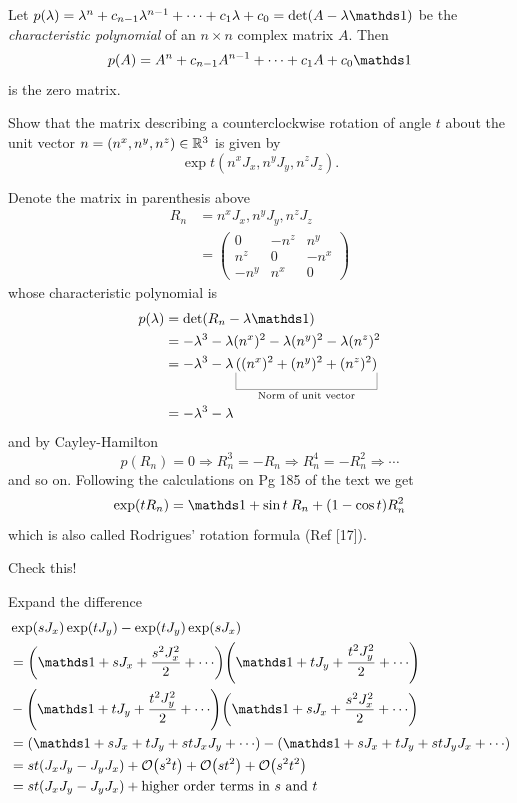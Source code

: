 \documentclass[10pt]{article}
\begin{document}
\begin{definition}
	 Let $p(\lambda) = \lambda^n + c_{n-1} \lambda^{n-1} + \cdots + c_1 \lambda + c_0 = \det(A - \lambda\id)$ be the \emph{characteristic polynomial} of an $n\times n$ complex matrix $A$. Then
	$$p(A) = A^n + c_{n-1} A^{n-1} + \cdots + c_1 A + c_0\id$$ is the zero matrix.
\end{definition}


\begin{example}
	Show that the matrix describing a counterclockwise rotation of angle $t$ about the unit vector $n = (n^x, n^y, n^z) \in \mathbb{R}^3$ is given by
	$$
	\exp t(n^xJ_x, n^yJ_y, n^zJ_z).
	$$
\end{example}
\sol Denote the matrix in parenthesis above
$$
\begin{aligned}
	R_n &= n^xJ_x, n^yJ_y, n^zJ_z\\
	&= \begin{pmatrix}
		0&-n^z&n^y\\n^z&0&-n^x\\-n^y&n^x&0
	\end{pmatrix}
\end{aligned}
$$
whose characteristic polynomial is
$$
\begin{aligned}
	p(\lambda) &= \det(R_n-\lambda\id)\\
	&= -\lambda^3 -\lambda  (n^x)^2-\lambda  (n^y)^2-\lambda  (n^z)^2\\
	&= -\lambda^3 -\lambda  \ub{((n^x)^2+(n^y)^2+(n^z)^2)}{\text{Norm of unit vector}}\\
	&= -\lambda^3 -\lambda
\end{aligned}
$$
and by Cayley-Hamilton 
$$
p(R_n) = 0 \Rightarrow R_n^3 = -R_n \Rightarrow R_n^4 = -R_n^2 \Rightarrow \cdots
$$
and so on. Following the calculations on Pg 185 of the text we get
$$
\exp(tR_n) = \id + \sin t\:R_n + (1-\cos t)R_n^2
$$
which is also called Rodrigues' rotation formula (Ref [17]).


\begin{example}
	Check this!
\end{example}
\sol Expand the difference
$$
\begin{aligned}
	&\exp(sJ_x)\exp(tJ_y)-\exp(tJ_y)\exp(sJ_x)\\
	&= \p*{\id+sJ_x+\frac{s^2J_x^2}{2}+\cdots}\p*{\id+tJ_y+\frac{t^2J_y^2}{2}+\cdots}\\
	&-\p*{\id+tJ_y+\frac{t^2J_y^2}{2}+\cdots}\p*{\id+sJ_x+\frac{s^2J_x^2}{2}+\cdots}\\
	&= \p*{\id+sJ_x+tJ_y+stJ_xJ_y+\cdots}-\p*{\id+sJ_x+tJ_y+stJ_yJ_x+\cdots}\\
	&= st(J_xJ_y-J_yJ_x) + \BigO{s^2t} + \BigO{st^2} + \BigO{s^2t^2}\\
	&= st(J_xJ_y-J_yJ_x) + \text{higher order terms in $s$ and $t$}
\end{aligned}
$$
\end{document}
